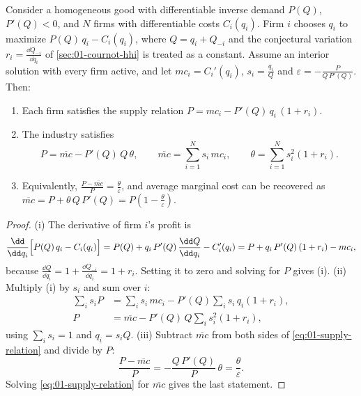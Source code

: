 \begin{proposition}\label{prop:01-supply-relation}
Consider a homogeneous good with differentiable inverse demand $P(Q)$, $P'(Q) < 0$, and $N$ firms with differentiable
costs $C_i(q_i)$. Firm $i$ chooses $q_i$ to maximize $P(Q)\,q_i - C_i(q_i)$, where $Q = q_i + Q_{-i}$ and the
conjectural variation $r_i = \frac{\dd Q_{-i}}{\dd q_i}$ of \cref{sec:01-cournot-hhi} is treated as a constant. Assume an interior solution
with every firm active, and let $mc_i = C_i'(q_i)$, $s_i = \frac{q_i}{Q}$ and $\varepsilon = -\frac{P}{Q\,P'(Q)}$.
Then:
\begin{enumerate}[label=(\roman*)]
\item Each firm satisfies the supply relation $P = mc_i - P'(Q)\,q_i\,(1 + r_i)$.
\item The industry satisfies
  \begin{equation}\label{eq:01-supply-relation}
  P = \overline{mc} - P'(Q)\,Q\,\theta, \qquad
  \overline{mc} = \sum_{i=1}^{N} s_i\, mc_i, \qquad
  \theta = \sum_{i=1}^{N} s_i^2 (1 + r_i).
  \end{equation}
\item Equivalently, $\frac{P - \overline{mc}}{P} = \frac{\theta}{\varepsilon}$, and average marginal cost can be
  recovered as $\overline{mc} = P + \theta\, Q\, P'(Q) = P\left(1 - \frac{\theta}{\varepsilon}\right)$.
\end{enumerate}
\end{proposition}

\begin{proof}
(i) The derivative of firm $i$'s profit is
\begin{equation*}
\frac{\dd}{\dd q_i}\Bigl[P(Q)\,q_i - C_i(q_i)\Bigr]
= P(Q) + q_i\,P'(Q)\,\frac{\dd Q}{\dd q_i} - C_i'(q_i)
= P + q_i\,P'(Q)\,(1 + r_i) - mc_i ,
\end{equation*}
because $\frac{\dd Q}{\dd q_i} = 1 + \frac{\dd Q_{-i}}{\dd q_i} = 1 + r_i$. Setting it to zero and solving for $P$
gives (i). (ii) Multiply (i) by $s_i$ and sum over $i$:
\begin{align*}
\sum_i s_i P &= \sum_i s_i\, mc_i - P'(Q)\sum_i s_i\, q_i (1 + r_i), \\
P &= \overline{mc} - P'(Q)\, Q \sum_i s_i^2 (1 + r_i),
\end{align*}
using $\sum_i s_i = 1$ and $q_i = s_i Q$. (iii) Subtract $\overline{mc}$ from both sides of \eqref{eq:01-supply-relation}
and divide by $P$:
\begin{equation*}
\frac{P - \overline{mc}}{P} = -\frac{Q\,P'(Q)}{P}\,\theta = \frac{\theta}{\varepsilon}.
\end{equation*}
Solving \eqref{eq:01-supply-relation} for $\overline{mc}$ gives the last statement.
\end{proof}

